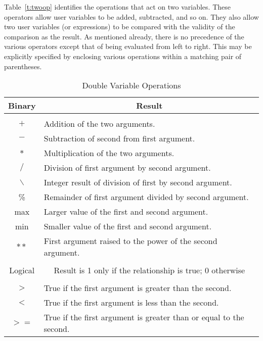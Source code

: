 Table~\ref{t:twoop} identifies the operations that act on two variables.
These operators allow user variables to be added, subtracted, and so on.
They also allow two user variables (or expressions) to be compared with
the validity of the comparison as the result.
As mentioned already, there is no precedence of the various operators
except that of being evaluated from left to right.
This may be explicitly specified by enclosing various
operations within a matching pair of parentheses.
\begin{table}
  \caption{Double Variable Operations}
  \centering
  \setlength{\tabentrylen}{\textwidth}
  \addtolength{\tabentrylen}{-1.0in}
  \begin{tabular}{|c|p{\tabentrylen}|} \hline\hline
    \multicolumn{1}{|c}{Binary} & \multicolumn{1}{|c|}{Result} \\ \hline
    & \\
    $+$          & Addition of the two arguments. \\
    $-$          & Subtraction of second from first argument. \\
    $*$          & Multiplication of the two arguments. \\
    $/$          & Division of first argument by second argument. \\
    $\backslash$ & Integer result of division of first by second argument. \\
    \%           & Remainder of first argument divided by second argument. \\
    max          & Larger value of the first and second argument. \\
    min          & Smaller value of the first and second argument. \\
    $**$         & First argument raised to the power of the second argument. \\
    & \\ \hline\hline
    \multicolumn{1}{|c}{Logical} &
    \multicolumn{1}{|c|}{Result is 1 only if the relationship is true;
    0 otherwise}
    \\ \hline
    & \\
    $>$  & True if the first argument is greater than the second. \\
    $<$  & True if the first argument is less than the second. \\
    $>=$ & True if the first argument is greater than or equal to the second. \\

\end{tabular}
\end{table}
